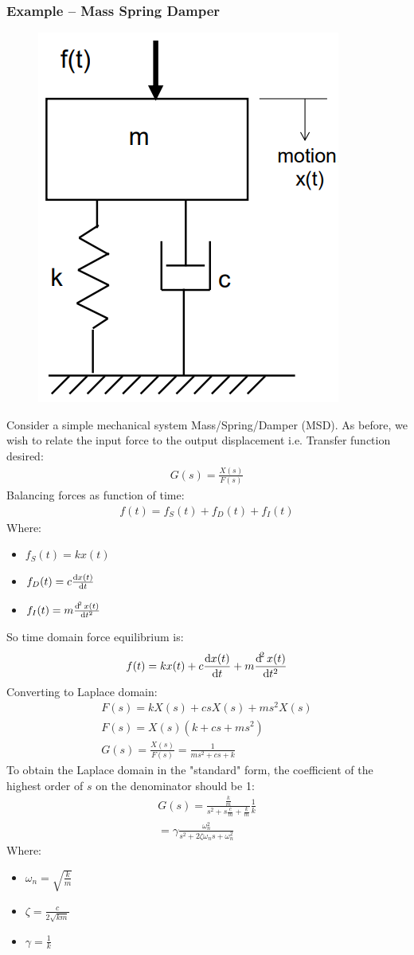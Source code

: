 \documentclass[class=report, crop=false, 12pt,a4paper]{standalone}
\begin{document}
\subsubsection*{Example – Mass Spring Damper}
\begin{figure}[H]
  \centering
  \includegraphics[width = 0.3 \textwidth]{../img/massspringdamper.PNG}
\end{figure}
Consider a simple mechanical system Mass/Spring/Damper (MSD). As before, we wish to relate the input force to the output displacement i.e. Transfer function desired:
\begin{gather}
  G(s) = \frac{X(s)}{F(s)}
\end{gather}
Balancing forces as function of time:
\begin{gather}
  f(t) = f_S(t) + f_D(t) + f_I(t)
\end{gather}
Where:
\begin{itemize}
  \item $f_S(t) = kx(t)$
  \item $f_D(t) = c\frac{\dif x(t)}{\dif t}$
  \item $f_I(t) = m\frac{\dif^2 x(t)}{\dif t^2}$
\end{itemize}
So time domain force equilibrium is:
\begin{gather}
  f(t) = kx(t) + c\frac{\dif x(t)}{\dif t} + m\frac{\dif^2 x(t)}{\dif t^2}
\end{gather}
Converting to Laplace domain:
\begin{gather}
  F(s) = kX(s) + csX(s) + ms^2X(s) \\
  F(s) = X(s)(k + cs + ms^2) \\
  G(s) = \frac{X(s)}{F(s)} = \frac{1}{ms^2 + cs + k}
\end{gather}
To obtain the Laplace domain in the "standard" form, the coefficient of the highest order of $s$ on the denominator should be 1:
\begin{gather}
  G(s) = \frac{\frac{k}{m}}{s^2 + s\frac{c}{m} + \frac{k}{m}}\frac{1}{k} \\
  = \gamma \frac{\omega_n^2}{s^2 + 2\zeta \omega_n s + \omega_n^2}
\end{gather}
Where:
\begin{itemize}
  \item $\omega_n = \sqrt{\frac{k}{m}}$
  \item $\zeta = \frac{c}{2\sqrt{km}}$
  \item $\gamma = \frac{1}{k}$
\end{itemize}
\end{document}

